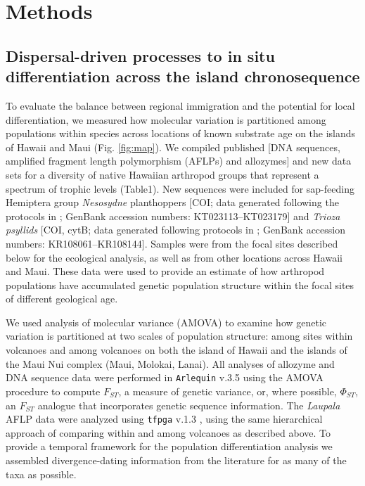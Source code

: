 \section{Methods}

\subsection{Dispersal-driven processes to in situ differentiation
across the island chronosequence}

To evaluate the balance between regional immigration and the potential
for local differentiation, we measured how molecular variation is
partitioned among populations within species across locations of known
substrate age on the islands of Hawaii and Maui (Fig. \ref{fig:map}). We compiled
published [DNA sequences, amplified fragment length polymorphism
(AFLPs) and allozymes] and new data sets for a diversity of native
Hawaiian arthropod groups that represent a spectrum of trophic levels
(Table1). New sequences were included for sap-feeding Hemiptera group
\textit{Nesosydne} planthoppers [COI; data generated following the
protocols in \citet{goodman2012}; GenBank accession numbers:
KT023113–KT023179] and \textit{Trioza psyllids} [COI, cytB; data
generated following protocols in \citet{percy2003}; GenBank accession
numbers: KR108061–KR108144]. Samples were from the focal sites
described below for the ecological analysis, as well as from other
locations across Hawaii and Maui. These data were used to provide an
estimate of how arthropod populations have accumulated genetic
population structure within the focal sites of different geological
age.

We used analysis of molecular variance (AMOVA) to examine how genetic
variation is partitioned at two scales of population structure: among
sites within volcanoes and among volcanoes on both the island of
Hawaii and the islands of the Maui Nui complex (Maui, Molokai,
Lanai). All analyses of allozyme and DNA sequence data were performed
in \texttt{Arlequin} v.3.5 \citep{arlequin} using the AMOVA procedure
to compute $F_{ST}$, a measure of genetic variance, or, where
possible, $\Phi_{ST}$, an $F_{ST}$ analogue that incorporates genetic
sequence information. The \textit{Laupala} AFLP data were analyzed
using \texttt{tfpga} v.1.3 \citep{miller1997}, using the same hierarchical
approach of comparing within and among volcanoes as described
above. To provide a temporal framework for the population
differentiation analysis we assembled divergence-dating information
from the literature for as many of the taxa as possible.

